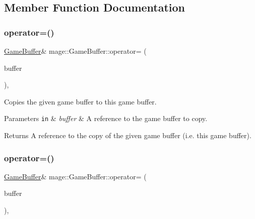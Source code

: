 \subsection{Member Function Documentation}
\hypertarget{structmage_1_1_game_buffer_add9fec0aa33f3d3563acd1cb5f9fe9d6}{}\label{structmage_1_1_game_buffer_add9fec0aa33f3d3563acd1cb5f9fe9d6} 
\subsubsection{\texorpdfstring{operator=()}{operator=()}\hspace{0.1cm}{\footnotesize\ttfamily [1/2]}}
{\footnotesize\ttfamily \hyperlink{structmage_1_1_game_buffer}{Game\+Buffer}\& mage\+::\+Game\+Buffer\+::operator= (\begin{DoxyParamCaption}\item[{const \hyperlink{structmage_1_1_game_buffer}{Game\+Buffer} \&}]{buffer }\end{DoxyParamCaption})\hspace{0.3cm}{\ttfamily [default]}, {\ttfamily [noexcept]}}

Copies the given game buffer to this game buffer.


\begin{DoxyParams}[1]{Parameters}
\mbox{\tt in}  & {\em buffer} & A reference to the game buffer to copy. \\
\hline
\end{DoxyParams}
\begin{DoxyReturn}{Returns}
A reference to the copy of the given game buffer (i.\+e. this game buffer). 
\end{DoxyReturn}
\hypertarget{structmage_1_1_game_buffer_a46f857f035922fe1beeb5a8f6b59e097}{}\label{structmage_1_1_game_buffer_a46f857f035922fe1beeb5a8f6b59e097} 
\subsubsection{\texorpdfstring{operator=()}{operator=()}\hspace{0.1cm}{\footnotesize\ttfamily [2/2]}}
{\footnotesize\ttfamily \hyperlink{structmage_1_1_game_buffer}{Game\+Buffer}\& mage\+::\+Game\+Buffer\+::operator= (\begin{DoxyParamCaption}\item[{\hyperlink{structmage_1_1_game_buffer}{Game\+Buffer} \&\&}]{buffer }\end{DoxyParamCaption})\hspace{0.3cm}{\ttfamily [default]}, {\ttfamily [noexcept]}}


